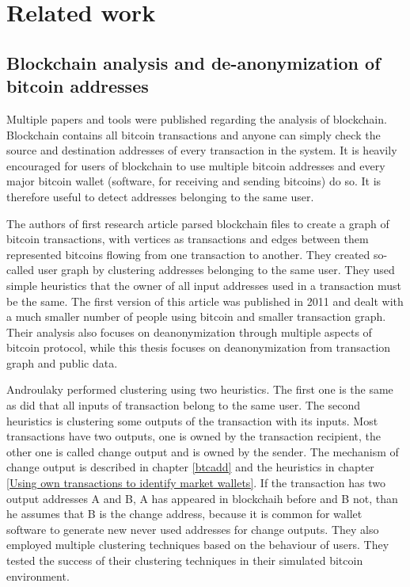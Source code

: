 \documentclass[
  digital, %
  table,   %
  lof,     %
  lot,     %
  oneside
]{fithesis3}
\begin{document}
\chapter{Related work}
\section{Blockchain analysis and de-anonymization of bitcoin addresses}

Multiple papers and tools were published regarding the analysis of blockchain.
Blockchain contains all bitcoin transactions and anyone can simply check
the source and destination addresses of every transaction in the system.
It is heavily encouraged for users of blockchain to use multiple bitcoin addresses
 and every major bitcoin wallet (software, for receiving and sending bitcoins) do so.
 It is therefore useful to detect addresses belonging to the same user.
 
The authors of first research article \parencite{reid2013analysis}
 parsed blockchain files to create a graph of bitcoin transactions, with vertices as transactions
 and edges between them represented bitcoins flowing from one transaction to another.
 They created so-called user graph by clustering addresses belonging to the same user.
 They used simple heuristics that the owner of all input addresses used in a transaction must be the same. The first version of this article  
was published in 2011 and dealt with a much smaller number of people using bitcoin and smaller transaction graph.
Their analysis also focuses on deanonymization through multiple aspects of bitcoin protocol,
while this thesis focuses on deanonymization from transaction graph and public data.

Androulaky \parencite{androulaki2013evaluating} performed clustering using two heuristics.
The first one is the same as \parencite{reid2013analysis} did that all inputs of transaction
belong to the same user. The second heuristics is clustering some outputs of the transaction with its inputs.
Most transactions have two outputs, one is owned by the transaction recipient,
the other one is called change output and is owned by
the sender. The mechanism of change output is described in chapter \ref{btcadd} and the heuristics in
chapter \ref{Using own transactions to identify market wallets}.
If the transaction has two output addresses A and B, A has appeared in blockchaih
before and B not, than he assumes that B is the change address, because it is common
for wallet software to generate new never used addresses for change outputs.
They also employed multiple clustering techniques based on the behaviour of users.
 They tested the success of their clustering techniques in their simulated bitcoin 
 environment.
\end{document}
